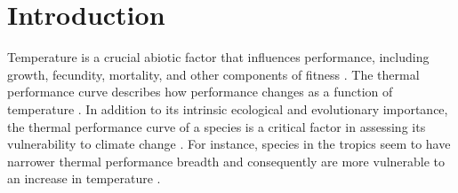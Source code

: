 \section*{Introduction}

Temperature is a crucial abiotic factor that influences performance, including growth, fecundity, mortality, and other components of fitness \citep{Birch1953,Angilletta2002,Huey1979,Savage2004}.
The thermal performance curve describes how performance changes as a function of temperature \citep{Huey1979,Angilletta2009, Amarasekare2012}.
In addition to its intrinsic ecological and evolutionary importance, the thermal performance curve of a species is a critical factor in assessing its vulnerability to climate change \citep{Calosi2008,Deutsch2008,Kingsolver2011}.
For instance, species in the tropics seem to have narrower thermal performance breadth and consequently are more vulnerable to an increase in temperature \citep{Deutsch2008}.

